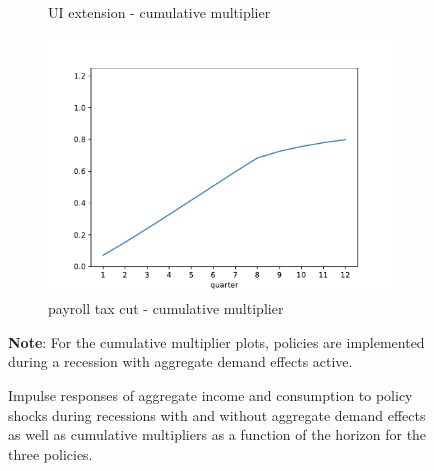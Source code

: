 \documentclass[\econtexRoot/HAFiscal]{subfiles}
\begin{document}
\begin{figure}[htb]
\begin{subfigure}[b]{.33\linewidth}
		\caption{UI extension - cumulative multiplier}
		\notinsubfile{\label{fig:recessionuirelrecession_Mult}}
	\end{subfigure}%
	\begin{subfigure}[b]{.33\linewidth}
		\centering
		\includegraphics[width=\linewidth]{Code/HA-Models/FromPandemicCode/Figures/Cummulative_multiplier_TaxCut}
		\caption{payroll tax cut - cumulative multiplier}
		\notinsubfile{\label{fig:recessiontaxcutrelrecession_Mult}}
	\end{subfigure}
	\caption{Impulse responses of aggregate income and consumption to policy shocks during recessions with and without aggregate demand effects as well as cumulative multipliers as a function of the horizon for the three policies. {\label{fig:Policyrelrecession}}}
	\parbox{16cm}{\small \vspace{.15cm} \textbf{Note}: For the cumulative multiplier plots, policies are implemented during a recession with aggregate demand effects active.\normalsize}
\end{figure}
\end{document}
